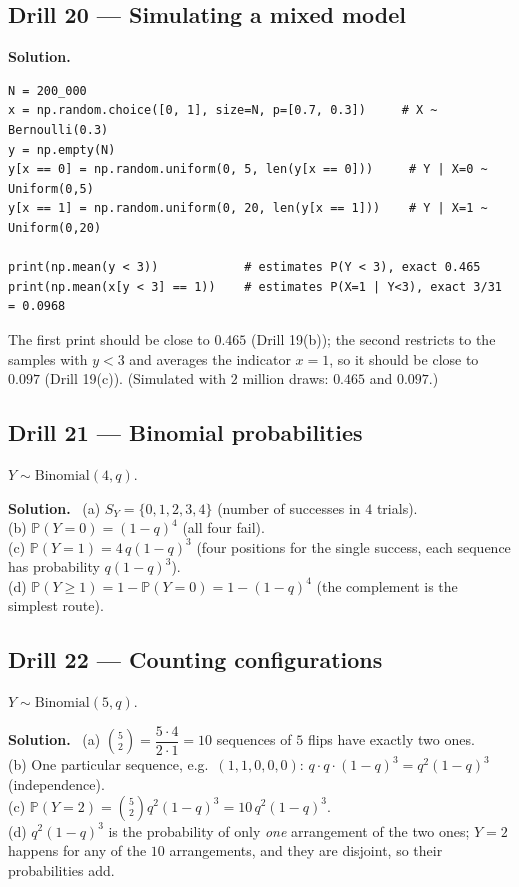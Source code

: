 \documentclass[11pt]{article}
\renewcommand{\P}{\mathbb{P}}
\newenvironment{soln}{\par\smallskip\noindent\textbf{Solution.}\ }{\par\medskip}
\begin{document}
\subsection*{Drill 20 --- Simulating a mixed model}
\begin{soln}
\begin{lstlisting}
N = 200_000
x = np.random.choice([0, 1], size=N, p=[0.7, 0.3])     # X ~ Bernoulli(0.3)
y = np.empty(N)
y[x == 0] = np.random.uniform(0, 5, len(y[x == 0]))     # Y | X=0 ~ Uniform(0,5)
y[x == 1] = np.random.uniform(0, 20, len(y[x == 1]))    # Y | X=1 ~ Uniform(0,20)

print(np.mean(y < 3))            # estimates P(Y < 3), exact 0.465
print(np.mean(x[y < 3] == 1))    # estimates P(X=1 | Y<3), exact 3/31 = 0.0968
\end{lstlisting}
The first print should be close to $0.465$ (Drill 19(b)); the second restricts to the samples with $y<3$ and averages the indicator $x=1$, so it should be close to $0.097$ (Drill 19(c)). (Simulated with $2$ million draws: $0.465$ and $0.097$.)
\end{soln}

\subsection*{Drill 21 --- Binomial probabilities}
$Y\sim\text{Binomial}(4,q)$.
\begin{soln}
(a) $S_Y=\{0,1,2,3,4\}$ (number of successes in $4$ trials).\\
(b) $\P(Y=0)=(1-q)^4$ (all four fail).\\
(c) $\P(Y=1)=4\,q(1-q)^3$ (four positions for the single success, each sequence has probability $q(1-q)^3$).\\
(d) $\P(Y\ge1)=1-\P(Y=0)=1-(1-q)^4$ (the complement is the simplest route).
\end{soln}

\subsection*{Drill 22 --- Counting configurations}
$Y\sim\text{Binomial}(5,q)$.
\begin{soln}
(a) $\binom52=\dfrac{5\cdot4}{2\cdot1}=10$ sequences of $5$ flips have exactly two ones.\\
(b) One particular sequence, e.g.\ $(1,1,0,0,0)$: $q\cdot q\cdot(1-q)^3=q^2(1-q)^3$ (independence).\\
(c) $\P(Y=2)=\binom52q^2(1-q)^3=10\,q^2(1-q)^3$.\\
(d) $q^2(1-q)^3$ is the probability of only \emph{one} arrangement of the two ones; $Y=2$ happens for any of the $10$ arrangements, and they are disjoint, so their probabilities add.
\end{soln}
\end{document}
